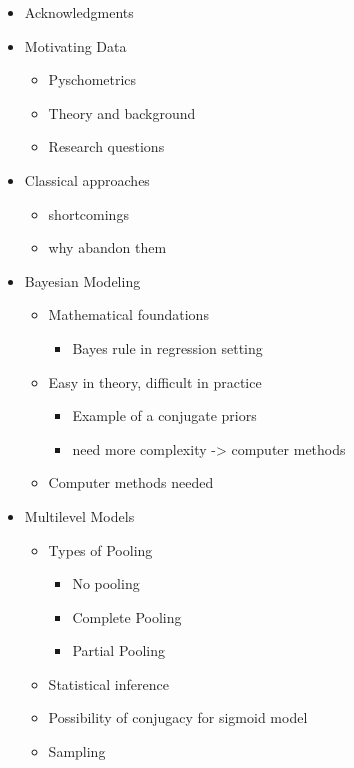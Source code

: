 \documentclass[
]{article}
\providecommand{\tightlist}{%
  \setlength{\itemsep}{0pt}\setlength{\parskip}{0pt}}
\begin{document}
\begin{itemize}
\item
  Acknowledgments
\item
  Motivating Data

  \begin{itemize}
  \tightlist
  \item
    Pyschometrics
  \item
    Theory and background
  \item
    Research questions
  \end{itemize}
\item
  Classical approaches

  \begin{itemize}
  \tightlist
  \item
    shortcomings
  \item
    why abandon them
  \end{itemize}
\item
  Bayesian Modeling

  \begin{itemize}
  \tightlist
  \item
    Mathematical foundations

    \begin{itemize}
    \tightlist
    \item
      Bayes rule in regression setting
    \end{itemize}
  \item
    Easy in theory, difficult in practice

    \begin{itemize}
    \tightlist
    \item
      Example of a conjugate priors
    \item
      need more complexity -\textgreater{} computer methods
    \end{itemize}
  \item
    Computer methods needed
  \end{itemize}
\item
  Multilevel Models

  \begin{itemize}
  \tightlist
  \item
    Types of Pooling

    \begin{itemize}
    \tightlist
    \item
      No pooling
    \item
      Complete Pooling
    \item
      Partial Pooling
    \end{itemize}
  \item
    Statistical inference
  \item
    Possibility of conjugacy for sigmoid model
  \item
    Sampling


\end{itemize}
\end{itemize}
\end{document}
